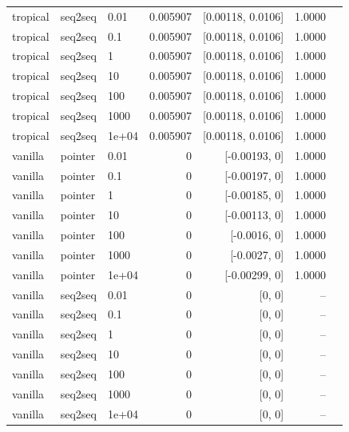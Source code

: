 \documentclass[10pt]{article}
\begin{document}
{\begin{longtable}{lllrrrl}
tropical & seq2seq & 0.01 & 0.005907 & [0.00118, 0.0106] & 1.0000 & \\
tropical & seq2seq & 0.1 & 0.005907 & [0.00118, 0.0106] & 1.0000 & \\
tropical & seq2seq & 1 & 0.005907 & [0.00118, 0.0106] & 1.0000 & \\
tropical & seq2seq & 10 & 0.005907 & [0.00118, 0.0106] & 1.0000 & \\
tropical & seq2seq & 100 & 0.005907 & [0.00118, 0.0106] & 1.0000 & \\
tropical & seq2seq & 1000 & 0.005907 & [0.00118, 0.0106] & 1.0000 & \\
tropical & seq2seq & 1e+04 & 0.005907 & [0.00118, 0.0106] & 1.0000 & \\
vanilla & pointer & 0.01 & 0 & [-0.00193, 0] & 1.0000 & \\
vanilla & pointer & 0.1 & 0 & [-0.00197, 0] & 1.0000 & \\
vanilla & pointer & 1 & 0 & [-0.00185, 0] & 1.0000 & \\
vanilla & pointer & 10 & 0 & [-0.00113, 0] & 1.0000 & \\
vanilla & pointer & 100 & 0 & [-0.0016, 0] & 1.0000 & \\
vanilla & pointer & 1000 & 0 & [-0.0027, 0] & 1.0000 & \\
vanilla & pointer & 1e+04 & 0 & [-0.00299, 0] & 1.0000 & \\
vanilla & seq2seq & 0.01 & 0 & [0, 0] & -- & \\
vanilla & seq2seq & 0.1 & 0 & [0, 0] & -- & \\
vanilla & seq2seq & 1 & 0 & [0, 0] & -- & \\
vanilla & seq2seq & 10 & 0 & [0, 0] & -- & \\
vanilla & seq2seq & 100 & 0 & [0, 0] & -- & \\
vanilla & seq2seq & 1000 & 0 & [0, 0] & -- & \\
vanilla & seq2seq & 1e+04 & 0 & [0, 0] & -- & \\
\bottomrule
\end{longtable}
}
\end{document}
